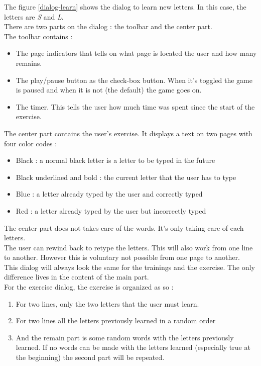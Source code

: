 The figure \ref{dialog-learn} shows the dialog to learn new letters. In this case, the letters are \textit{S} and \textit{L}.\\
There are two parts on the dialog : the toolbar and the center part.\\
The toolbar contains :
\begin{itemize}
	\item The page indicators that tells on what page is located the user and how many remains.
	\item The play/pause button as the check-box button. When it's toggled the game is paused and when it is not (the default) the game goes on.
	\item The timer. This tells the user how much time was spent since the start of the exercise.
\end{itemize}

The center part contains the user's exercise. It displays a text on two pages with four color codes :
\begin{itemize}
	\item Black : a normal black letter is a letter to be typed in the future
	\item Black underlined and bold : the current letter that the user has to type
	\item Blue : a letter already typed by the user and correctly typed
	\item Red  : a letter already typed by the user but incorrectly typed
\end{itemize}

The center part does not takes care of the words. It's only taking care of each letters.\\
The user can rewind back to retype the letters. This will also work from one line to another. However this is voluntary not possible
from one page to another.\\
This dialog will always look the same for the trainings and the exercise. The only difference lives in the content of the main part.\\
For the exercise dialog, the exercise is organized as so :
\begin{enumerate}
	\item For two lines, only the two letters that the user must learn.
	\item For two lines all the letters previously learned in a random order
	\item And the remain part is some random words with the letters previously learned. If no words can be made with the letters learned (especially true at the beginning) the second part will be repeated.
\end{enumerate}

